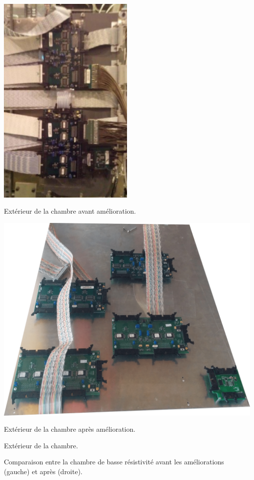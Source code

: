 \begin{minipage}[th!]{1\textwidth}
\hfill
\begin{minipage}[th!]{1\textwidth}
	\noindent
	\centering
	\begin{minipage}[th!]{0.45\textwidth}
		\noindent
		\centering
		\renewcommand\thesubfigure{(\alph{subfigure}.1)}
		\includegraphics[width=0.50\textwidth]{GLA/FEBplexis2.png}
		\captionsetup{type=subfigure}\caption{Extérieur de la chambre avant amélioration.}
		\label{b1}
		\addtocounter{subfigure}{-1}
	\end{minipage}%
	\hfill
	\begin{minipage}[th!]{0.45\textwidth}
		\noindent
		\centering
		\renewcommand\thesubfigure{(\alph{subfigure}.2)}
		\includegraphics[width=1\textwidth]{GLA/FEBnew.png}
		\captionsetup{type=subfigure}\caption{Extérieur de la chambre après amélioration.}
		\label{b2}
		\addtocounter{subfigure}{-1}
	\end{minipage}%
	\renewcommand\thesubfigure{(\alph{subfigure})}
	\captionsetup{type=subfigure}\caption{Extérieur de la chambre.}
	\label{blabla2}
\end{minipage}%
\addtocounter{figure}{-1}
\captionsetup{type=figure}\caption{Comparaison entre la chambre de basse résistivité avant les améliorations (gauche) et après (droite).}
\label{mainblabla}
\end{minipage}%


